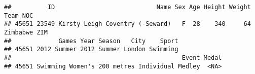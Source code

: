 \documentclass[
]{article}
\newenvironment{Shaded}{\begin{snugshade}}{\end{snugshade}}
\newcommand{\CommentTok}[1]{\textcolor[rgb]{0.56,0.35,0.01}{\textit{#1}}}
\newcommand{\FunctionTok}[1]{\textcolor[rgb]{0.00,0.00,0.00}{#1}}
\newcommand{\NormalTok}[1]{#1}
\newcommand{\SpecialCharTok}[1]{\textcolor[rgb]{0.00,0.00,0.00}{#1}}
\newcommand{\StringTok}[1]{\textcolor[rgb]{0.31,0.60,0.02}{#1}}
\begin{document}
\begin{verbatim}
##          ID                            Name Sex Age Height Weight     Team NOC
## 45651 23549 Kirsty Leigh Coventry (-Seward)   F  28    340     64 Zimbabwe ZIM
##             Games Year Season   City    Sport
## 45651 2012 Summer 2012 Summer London Swimming
##                                               Event Medal
## 45651 Swimming Women's 200 metres Individual Medley  <NA>
\end{verbatim}

\begin{Shaded}
\end{Shaded}
\end{document}
